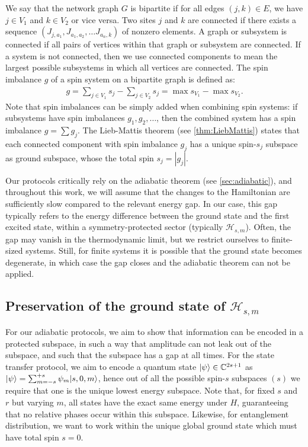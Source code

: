 We say that the network graph $G$ is bipartite if for all edges $(j,k) \in E$, we have $j \in V_1$ and $k \in V_2$ or vice versa. Two sites $j$ and $k$ are connected if there exists a sequence $(J_{j,a_1}, J_{a_1,a_2}, \ldots J_{a_n, k})$ of nonzero elements. A graph or subsystem is connected if all pairs of vertices within that graph or subsystem are connected. If a system is not connected, then we use connected components to mean the largest possible subsystems in which all vertices are connected. The spin imbalance $g$ of a spin system on a bipartite graph is defined as: 
\begin{align}
g = \sum_{j \in V_1} s_j - \sum_{j \in V_2} s_j = \max s_{V_1} - \max s_{V_2}.
\end{align}
Note that spin imbalances can be simply added when combining spin systems: if subsystems have spin imbalances $g_1, g_2, \ldots$, then the combined system has a spin imbalance $g = \sum g_j$. The Lieb-Mattis theorem \cite{Lieb1962} (see \cref{thm:LiebMattis}) states that each connected component with spin imbalance $g_j$ has a unique spin-$s_j$ subspace as ground subspace, whose the total spin $s_j= |g_j|$. 


Our protocols critically rely on the adiabatic theorem \cite{Born1928}  (see \cref{sec:adiabatic}), and throughout this work, we will assume that the changes to the Hamiltonian are sufficiently slow compared to the relevant energy gap. In our case, this gap typically refers to the energy difference between the ground state and the first excited state, within a symmetry-protected sector (typically $\mathcal{H}_{s,m}$). Often, the gap may vanish in the thermodynamic limit, but we restrict ourselves to finite-sized systems. Still, for finite systems it is possible that the ground state becomes degenerate, in which case the gap closes and the adiabatic theorem can not be applied.


\subsection{Preservation of the ground state of $\mathcal{H}_{s,m}$}
For our adiabatic protocols, we aim to show that information can be encoded in a protected subspace, in such a way that amplitude can not leak out of the subspace, and such that the subspace has a gap at all times. For the state transfer protocol, we aim to encode a quantum state $\lvert\psi\rangle \in \mathbb{C}^{2s+1}$ as $\lvert\psi\rangle = \sum_{m=-s}^{+s} \psi_m \lvert s,0,m\rangle$, hence out of all the possible spin-$s$ subspaces $(s)$ we require that one is the unique lowest energy subspace. Note that, for fixed $s$ and $r$ but varying $m$, all states have the exact same energy under $H$, guaranteeing that no relative phases occur within this subspace. Likewise, for entanglement distribution, we want to work within the unique global ground state which must have total spin $s=0$. 

